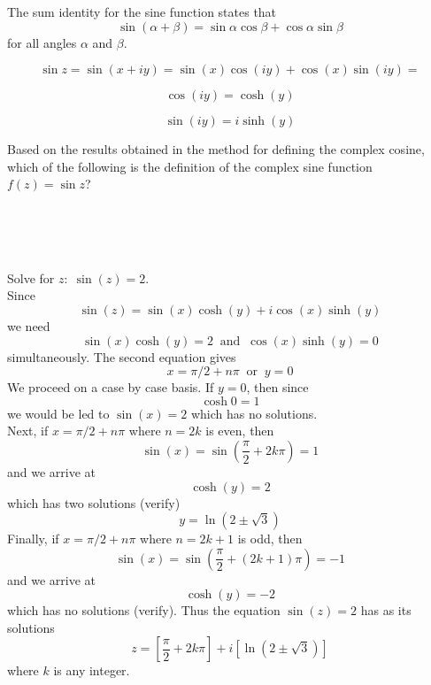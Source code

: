 \documentclass[handout]{ximera}
\begin{document}
\begin{question}
The sum identity for the sine function states that
\[
\sin(\alpha + \beta) = \sin \alpha \cos \beta + \cos \alpha \sin \beta
\]
for all angles $\alpha$ and $\beta$.

\begin{hint}
\[
\sin{z} = \sin(x+iy) = \sin(x) \cos(iy) + \cos(x) \sin(iy) =
\]
\end{hint}
\begin{hint}
\[
 \cos(iy) = \cosh(y)
\]
\end{hint}
\begin{hint}
\[
\sin(iy) = i \sinh(y)
\]
\end{hint}


Based on the results obtained in the method for defining the complex cosine, which of the following is the definition 
of the complex sine function $f(z) = \sin z$?
\begin{multipleChoice}
\\
\\
\\
\end{multipleChoice}
\end{question}


\begin{example}[example 1]
Solve for $z: \; \sin(z) = 2$.\\
Since
\[
\sin(z) = \sin(x) \cosh(y) + i\cos(x) \sinh(y)
\]
we need 
\[
\sin(x) \cosh(y) =2 \;\; \mbox{and} \;\; \cos(x) \sinh(y) = 0
\]
simultaneously. The second equation gives
\[
x = \pi/2 + n\pi \;\; \mbox{or} \;\; y = 0
\]
We proceed on a case by case basis. If $y = 0$, then since
\[
\cosh 0 = 1
\]
we would be led to $\sin(x) = 2$ which has no solutions.\\
Next, if $x = \pi/2 + n\pi$ where $n=2k$ is even, then 
\[
\sin(x) = \sin\left(\frac{\pi}{2} + 2k\pi\right) = 1
\]
and we arrive at 
\[
\cosh(y) = 2
\]
which has two solutions (verify)
\[
y = \ln\left(2\pm \sqrt 3 \right)
\]
Finally, if $x = \pi/2 + n\pi$ where $n=2k+1$ is odd, then 
\[
\sin(x) = \sin\left(\frac{\pi}{2} + (2k+1)\pi\right) = -1
\]
and we arrive at 
\[
\cosh(y) = -2
\]
which has no solutions (verify).
Thus the equation $\sin(z) = 2$ has as its solutions
\[
z = \left[\frac{\pi}{2} + 2k\pi\right] + i\left[\ln\left(2\pm \sqrt 3\right)\right]
\]
where $k$ is any integer.
\end{example}
\end{document}

